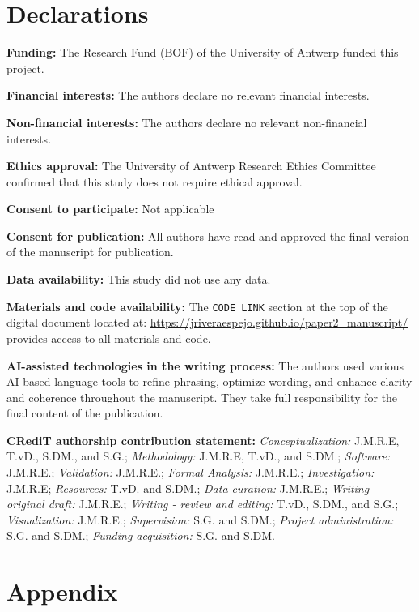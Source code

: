 \documentclass[
  authoryear,
  review,
  1p]{elsarticle}
\begin{document}
\newpage{}

\section*{Declarations}\label{declarations}

\textbf{Funding:} The Research Fund (BOF) of the University of Antwerp
funded this project.

\textbf{Financial interests:} The authors declare no relevant financial
interests.

\textbf{Non-financial interests:} The authors declare no relevant
non-financial interests.

\textbf{Ethics approval:} The University of Antwerp Research Ethics
Committee confirmed that this study does not require ethical approval.

\textbf{Consent to participate:} Not applicable

\textbf{Consent for publication:} All authors have read and approved the
final version of the manuscript for publication.

\textbf{Data availability:} This study did not use any data.

\textbf{Materials and code availability:} The \texttt{CODE\ LINK}
section at the top of the digital document located at:
\url{https://jriveraespejo.github.io/paper2_manuscript/} provides access
to all materials and code.

\textbf{AI-assisted technologies in the writing process:} The authors
used various AI-based language tools to refine phrasing, optimize
wording, and enhance clarity and coherence throughout the manuscript.
They take full responsibility for the final content of the publication.

\textbf{CRediT authorship contribution statement:}
\emph{Conceptualization:} J.M.R.E, T.vD., S.DM., and S.G.;
\emph{Methodology:} J.M.R.E, T.vD., and S.DM.; \emph{Software:}
J.M.R.E.; \emph{Validation:} J.M.R.E.; \emph{Formal Analysis:} J.M.R.E.;
\emph{Investigation:} J.M.R.E; \emph{Resources:} T.vD. and S.DM.;
\emph{Data curation:} J.M.R.E.; \emph{Writing - original draft:}
J.M.R.E.; \emph{Writing - review and editing:} T.vD., S.DM., and S.G.;
\emph{Visualization:} J.M.R.E.; \emph{Supervision:} S.G. and S.DM.;
\emph{Project administration:} S.G. and S.DM.; \emph{Funding
acquisition:} S.G. and S.DM.

\newpage{}

\section{Appendix}\label{sec-appendix}
\end{document}
